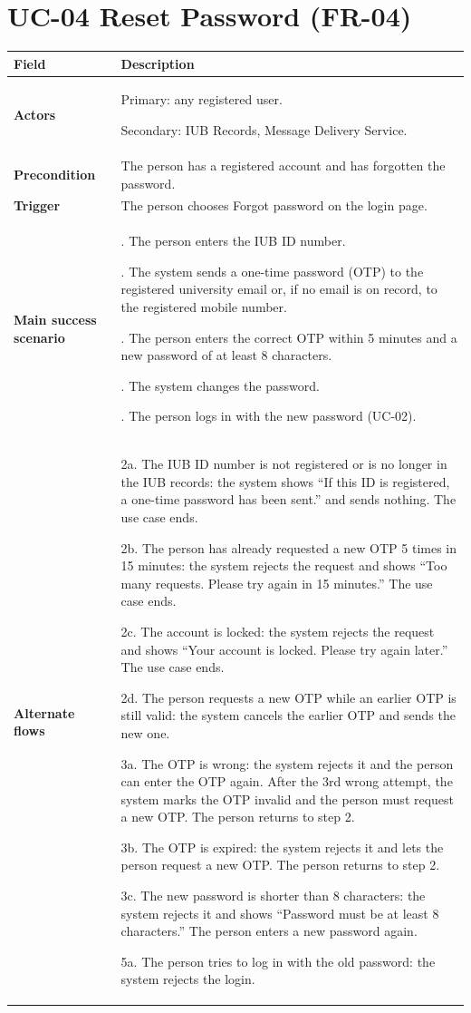\documentclass[11pt,a4paper]{report}
\begin{document}
\section{UC-04 Reset Password (FR-04)}
\begin{longtable}{|>{\raggedright\arraybackslash}p{3.0cm}|>{\raggedright\arraybackslash}p{12.4cm}|}
\hline \textbf{Field} & \textbf{Description} \\ \hline \endhead
\textbf{Actors} & Primary: any registered user.\par\smallskip Secondary: IUB Records, Message Delivery Service. \\ \hline
\textbf{Precondition} & The person has a registered account and has forgotten the password. \\ \hline
\textbf{Trigger} & The person chooses Forgot password on the login page. \\ \hline
\textbf{Main success scenario} & 1. The person enters the IUB ID number.\par\smallskip 2. The system sends a one-time password (OTP) to the registered university email or, if no email is on record, to the registered mobile number.\par\smallskip 3. The person enters the correct OTP within 5 minutes and a new password of at least 8 characters.\par\smallskip 4. The system changes the password.\par\smallskip 5. The person logs in with the new password (UC-02). \\ \hline
\textbf{Alternate flows} & 2a. The IUB ID number is not registered or is no longer in the IUB records: the system shows ``If this ID is registered, a one-time password has been sent.'' and sends nothing. The use case ends.\par\smallskip 2b. The person has already requested a new OTP 5 times in 15 minutes: the system rejects the request and shows ``Too many requests. Please try again in 15 minutes.'' The use case ends.\par\smallskip 2c. The account is locked: the system rejects the request and shows ``Your account is locked. Please try again later.'' The use case ends.\par\smallskip 2d. The person requests a new OTP while an earlier OTP is still valid: the system cancels the earlier OTP and sends the new one.\par\smallskip 3a. The OTP is wrong: the system rejects it and the person can enter the OTP again. After the 3rd wrong attempt, the system marks the OTP invalid and the person must request a new OTP. The person returns to step 2.\par\smallskip 3b. The OTP is expired: the system rejects it and lets the person request a new OTP. The person returns to step 2.\par\smallskip 3c. The new password is shorter than 8 characters: the system rejects it and shows ``Password must be at least 8 characters.'' The person enters a new password again.\par\smallskip 5a. The person tries to log in with the old password: the system rejects the login. \\ \hline

\end{longtable}
\end{document}
